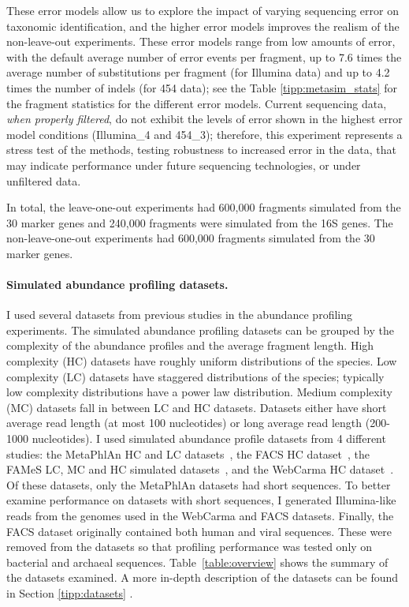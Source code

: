 These error models allow us to  explore 
the impact of varying sequencing error on taxonomic
identification, and the higher error models
improves the 
realism of the non-leave-out experiments.
These error models range from low amounts of error,
with the default average number of error 
events per fragment, up to 7.6 times the 
average number of substitutions per fragment (for Illumina data)
and up to 4.2 times the number of indels (for 454 data);
see the Table \ref{tipp:metasim_stats} 
for
the fragment 
statistics for the different error models.   
Current sequencing  data, \emph{when
properly filtered}, do not exhibit the
levels of error shown in the highest error
model conditions
(Illumina\_4 and  454\_3); therefore,
this experiment 
represents a stress test
of the methods, testing
robustness to increased
error in the data, that
may indicate performance under future
sequencing technologies, or under unfiltered data.

In total, 
the leave-one-out experiments
had 600,000 fragments simulated from the 30 marker genes and 240,000 
fragments were simulated from the 16S genes.
The non-leave-one-out experiments had 600,000 fragments simulated 
from the 30 marker genes.

\paragraph{\bf Simulated abundance profiling datasets. }
I used several datasets from previous studies in the abundance profiling experiments.  
The simulated abundance profiling datasets can be grouped by the complexity of the abundance profiles and the average fragment length.  High complexity (HC) datasets have 
roughly uniform distributions of the species.  
Low complexity (LC) datasets have staggered distributions 
of the species; typically low complexity distributions have a 
power law distribution.  Medium complexity (MC) datasets fall in between LC and HC datasets.  Datasets either have short average read length 
(at most 100 nucleotides) or long average read length (200-1000 nucleotides).  
I used simulated abundance profile datasets from 4 different studies: the MetaPhlAn HC and LC datasets~\cite{Segata2012a}, the FACS HC dataset~\cite{Stranneheim2010}, the FAMeS LC, MC and HC simulated datasets~\cite{Mavromatis2007}, and the WebCarma HC dataset~\cite{Gerlach2011b}.  
Of these datasets, only the MetaPhlAn datasets had short sequences.
To better examine performance on datasets with short sequences, 
I generated Illumina-like reads from the genomes used in the WebCarma and FACS datasets.  Finally, the FACS dataset originally contained both human and viral sequences.  These were removed from the datasets so that profiling performance was tested only on bacterial and archaeal sequences.  Table~\ref{table:overview} shows the summary of the datasets examined.  A more in-depth description of the datasets can be found in Section \ref{tipp:datasets}
.

